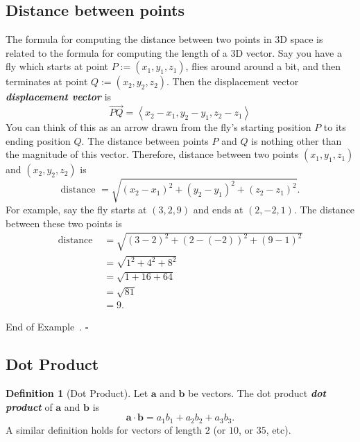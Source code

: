 \documentclass[10pt]{article}
\DeclareRobustCommand{\demph}[1]{%
  \ifmmode
  {\color{Blue}#1}%
  \else
  {\color{Blue}\bfseries\slshape #1}%
  \fi
}
\theoremstyle{definition}
\newtheorem{definition}[theorem]{Definition}
\newtheorem{example}[theorem]{Example}
\renewenvironment{example}
{\begin{oldexample}}
  {\par\smallskip\hfill   End of Example~\theexample. $\square$    \par\end{oldexample}}
\newcommand{\1}[1]{\textbf{1}_{\left[#1\right]}} %
\begin{document}
\subsection{Distance between points}
\begin{example}[Distance between points]
  The formula for computing the distance between two points in 3D space is related to the formula for
  computing the length of a 3D vector. Say you have a fly which starts at point $P:=(x_{1},y_{1},z_{1})$,
  flies around around a bit, and then terminates at point $Q:=(x_{2},y_{2},z_{2})$. Then the
  \demph{displacement vector} is
  \begin{equation*}
    \overrightarrow{PQ} = \left\langle x_{2}-x_{1},y_{2}-y_{1},z_{2}-z_{1} \right\rangle 
  \end{equation*}
  You can think of this as an arrow drawn from the fly's starting position $P$ to its ending position
  $Q$. The distance between points $P$ and $Q$ is nothing other than the magnitude of this vector.
  Therefore, distance between two points $(x_{1},y_{1},z_{1})$
  and $(x_{2},y_{2},z_{2})$ is
  \begin{equation*}
    \text{distance } 
    = \sqrt{\left( x_{2}-x_{1} \right)^{2} + \left( y_{2}-y_{1} \right)^{2} + \left( z_{2}-z_{1} \right)^{2}}.
  \end{equation*}
  For example, say the fly starts at $(3,2,9)$ and ends at $(2,-2,1)$. The distance between these two
  points is
  \begin{align*}
    \text{distance }
    &= \sqrt{\left( 3-2 \right)^{2}+\left( 2-(-2) \right)^{2}+(9-1)^{2}  }\\
    &= \sqrt{1^{2}+4^{2}+8^{2}}\\
    &= \sqrt{1+16+64}\\
    &= \sqrt{81}\\
    &=9.
  \end{align*}
\end{example}



\subsection{Dot Product}

\begin{definition}[Dot Product]
  Let $\mathbf{a}$ and $\mathbf{b}$ be vectors. The \demph{dot product} of $\mathbf{a}$ and $\mathbf{b}$ is
  \begin{equation*}
    \mathbf{a}\cdot \mathbf{b} = a_{1}b_{1}+ a_{2}b_{2}+ a_{3}b_{3}.
  \end{equation*}
  A similar definition holds for vectors of length $2$ (or $10$, or $35$, etc).
\end{definition}
\end{document}
